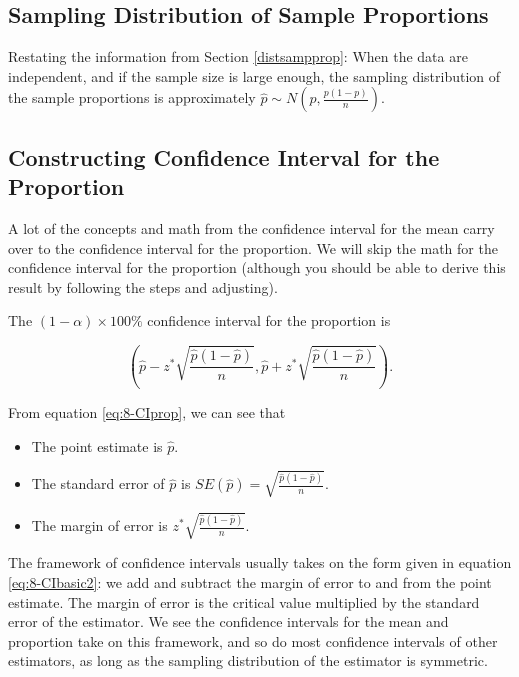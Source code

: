 \documentclass[
]{book}
\providecommand{\tightlist}{%
  \setlength{\itemsep}{0pt}\setlength{\parskip}{0pt}}
\theoremstyle{definition}
\theoremstyle{definition}
\theoremstyle{definition}
\theoremstyle{definition}
\theoremstyle{remark}
\begin{document}
\hypertarget{sampling-distribution-of-sample-proportions}{%
\subsection{Sampling Distribution of Sample Proportions}\label{sampling-distribution-of-sample-proportions}}

Restating the information from Section \ref{distsampprop}: When the data are independent, and if the sample size is large enough, the sampling distribution of the sample proportions is approximately \(\hat{p} \sim N\left(p, \frac{p(1-p)}{n}\right)\).

\hypertarget{constructing-confidence-interval-for-the-proportion}{%
\subsection{Constructing Confidence Interval for the Proportion}\label{constructing-confidence-interval-for-the-proportion}}

A lot of the concepts and math from the confidence interval for the mean carry over to the confidence interval for the proportion. We will skip the math for the confidence interval for the proportion (although you should be able to derive this result by following the steps and adjusting).

The \((1-\alpha) \times 100\%\) confidence interval for the proportion is

\begin{equation} 
\left( \hat{p} - z^{*} \sqrt{\frac{\hat{p}(1-\hat{p})}{n}}, \hat{p} + z^{*} \sqrt{\frac{\hat{p}(1-\hat{p})}{n}} \right).
\label{eq:8-CIprop}
\end{equation}

From equation \eqref{eq:8-CIprop}, we can see that

\begin{itemize}
\tightlist
\item
  The point estimate is \(\hat{p}\).
\item
  The standard error of \(\hat{p}\) is \(SE(\hat{p}) = \sqrt{\frac{\hat{p}(1-\hat{p})}{n}}\).
\item
  The margin of error is \(z^{*} \sqrt{\frac{\hat{p}(1-\hat{p})}{n}}\).
\end{itemize}

The framework of confidence intervals usually takes on the form given in equation \eqref{eq:8-CIbasic2}: we add and subtract the margin of error to and from the point estimate. The margin of error is the critical value multiplied by the standard error of the estimator. We see the confidence intervals for the mean and proportion take on this framework, and so do most confidence intervals of other estimators, as long as the sampling distribution of the estimator is symmetric.
\end{document}
